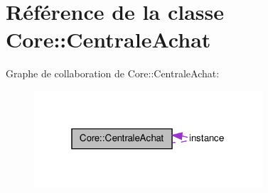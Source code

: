 \hypertarget{class_core_1_1_centrale_achat}{
\section{Référence de la classe Core::CentraleAchat}
\label{da/d4d/class_core_1_1_centrale_achat}
}


Graphe de collaboration de Core::CentraleAchat:\nopagebreak
\begin{figure}[H]
\begin{center}
\leavevmode
\includegraphics[width=241pt]{df/d06/class_core_1_1_centrale_achat__coll__graph}
\end{center}
\end{figure}
